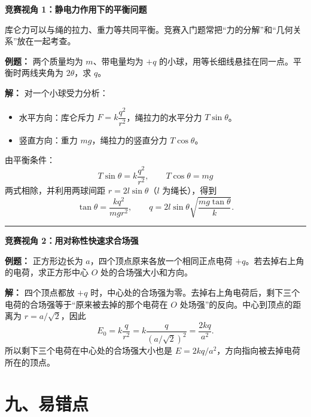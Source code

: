 \begin{competitionbox}
\textbf{竞赛视角 1：静电力作用下的平衡问题}

库仑力可以与绳的拉力、重力等共同平衡。竞赛入门题常把“力的分解”和“几何关系”放在一起考查。

\textbf{例题：} 两个质量均为 $m$、带电量均为 $+q$ 的小球，用等长细线悬挂在同一点。平衡时两线夹角为 $2\theta$，求 $q$。

\begin{center}


\label{fig:charged-pendulum-equilibrium}
\end{center}

\textbf{解：} 对一个小球受力分析：
\begin{itemize}
  \item 水平方向：库仑斥力 $F = k\dfrac{q^2}{r^2}$，绳拉力的水平分力 $T\sin\theta$。
  \item 竖直方向：重力 $mg$，绳拉力的竖直分力 $T\cos\theta$。
\end{itemize}
由平衡条件：
\[
T\sin\theta = k\frac{q^2}{r^2},\qquad T\cos\theta = mg
\]
两式相除，并利用两球间距 $r=2l\sin\theta$（$l$ 为绳长），得到
\[
\tan\theta=\frac{kq^2}{mgr^2},\qquad
\boxed{q=2l\sin\theta\sqrt{\frac{mg\tan\theta}{k}}}.
\]

\medskip
\hrule
\medskip
\textbf{竞赛视角 2：用对称性快速求合场强}

\textbf{例题：} 正方形边长为 $a$，四个顶点原来各放一个相同正点电荷 $+q$。若去掉右上角的电荷，求正方形中心 $O$ 处的合场强大小和方向。

\begin{center}


\label{fig:square-missing-charge-field}
\end{center}

\textbf{解：} 四个顶点都放 $+q$ 时，中心处的合场强为零。去掉右上角电荷后，剩下三个电荷的合场强等于“原来被去掉的那个电荷在 $O$ 处场强”的反向。中心到顶点的距离为 $r=a/\sqrt2$，因此
\[
E_0=k\frac{q}{r^2}
=k\frac{q}{(a/\sqrt2)^2}
=\frac{2kq}{a^2}.
\]
所以剩下三个电荷在中心处的合场强大小也是
$E=2kq/a^2$，方向指向被去掉电荷所在的顶点。
\end{competitionbox}

\section*{九、易错点}

